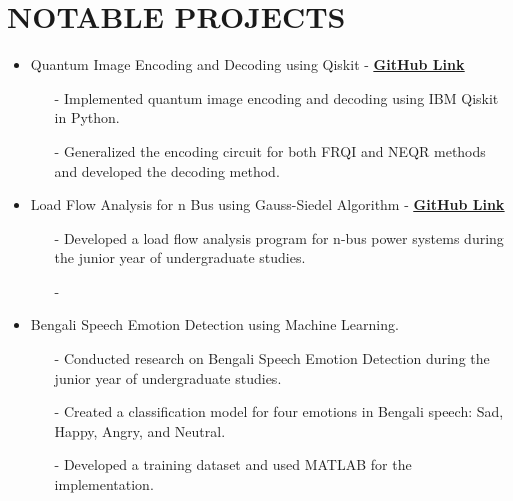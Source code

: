 \documentclass[letterpaper,11pt]{article}
\begin{document}
\section*{\textbf{NOTABLE PROJECTS}}
\begin{itemize}[left=0cm]
    \setlength\itemsep{-0.075em} %
    \setlength\parskip{-0.075em} %
    \item Quantum Image Encoding and Decoding using Qiskit - \href{https://github.com/syedshubha/QuantumImageProcessing/blob/main/qiskit_assignment_shubha.ipynb}{\underline{\textbf{GitHub Link}}}
    \begin{itemize}[left=0cm]
        \item[-] \small \justifying Implemented quantum image encoding and decoding using IBM Qiskit in Python.
        \item[-] \small  \justifying Generalized the encoding circuit for both FRQI and NEQR methods and developed the decoding method.
    \end{itemize}
    
    \item Load Flow Analysis for n Bus using Gauss-Siedel Algorithm - \href{https://github.com/syedshubha/load_flow_analysis_gauss_seidel}{\underline{\textbf{GitHub Link}}}
    \begin{itemize}[left=0cm]
        \item[-] \small  \justifying Developed a load flow analysis program for n-bus power systems  during the junior year of undergraduate studies.
        \item[-] \small {} 
    \end{itemize}

    \item Bengali Speech Emotion Detection using Machine Learning. 
    \begin{itemize}[left=0cm]
        \item[-] \small  \justifying Conducted research on Bengali Speech Emotion Detection during the junior year of undergraduate studies.
        \item[-] \small  \justifying Created a classification model for four emotions in Bengali speech: Sad, Happy, Angry, and Neutral.
        \item[-] \small  \justifying Developed a training dataset and used MATLAB for the implementation.
    \end{itemize}
\end{itemize}
\end{document}
